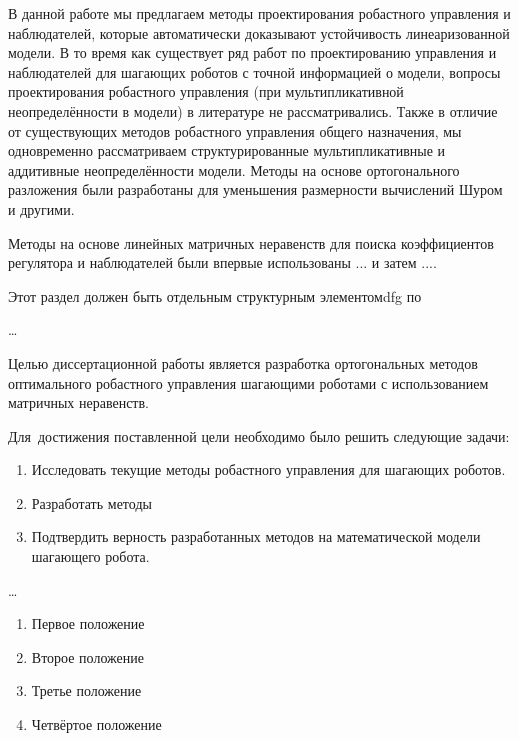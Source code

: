В данной работе мы предлагаем методы проектирования робастного управления и наблюдателей, которые автоматически доказывают устойчивость линеаризованной модели. В то время как существует ряд работ по проектированию управления и наблюдателей для шагающих роботов с точной информацией о модели, вопросы проектирования робастного управления (при мультипликативной неопределённости в модели) в литературе не рассматривались. Также в отличие от существующих методов робастного управления общего назначения, мы одновременно рассматриваем структурированные мультипликативные и аддитивные неопределённости модели.
Методы на основе ортогонального разложения были разработаны для уменьшения размерности вычислений Шуром и другими.

Методы на основе линейных матричных неравенств для поиска коэффициентов регулятора и наблюдателей были впервые использованы ... и затем ....


{\progress}

Этот раздел должен быть отдельным структурным элементомdfg по

{\objectsubject} 

\ldots

{\aimtasks} 

Целью диссертационной работы является разработка ортогональных методов оптимального робастного управления шагающими роботами с использованием матричных неравенств.

Для~достижения поставленной цели необходимо было решить следующие задачи:
\begin{enumerate}[beginpenalty=10000] %
	\item Исследовать текущие методы робастного управления для шагающих роботов.
	\item Разработать методы
	\item Подтвердить верность разработанных методов на математической модели шагающего робота.
\end{enumerate}

{\methods} 

\ldots

{}

\begin{enumerate}[beginpenalty=10000] %
	\item Первое положение
	\item Второе положение
	\item Третье положение
	\item Четвёртое положение
\end{enumerate}


